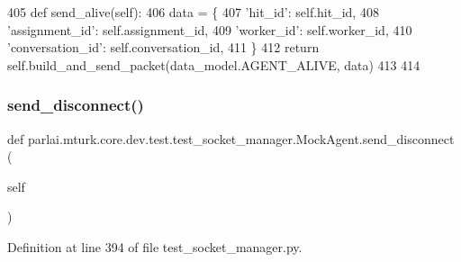 \begin{DoxyCode}
405     \textcolor{keyword}{def }send\_alive(self):
406         data = \{
407             \textcolor{stringliteral}{'hit\_id'}: self.hit\_id,
408             \textcolor{stringliteral}{'assignment\_id'}: self.assignment\_id,
409             \textcolor{stringliteral}{'worker\_id'}: self.worker\_id,
410             \textcolor{stringliteral}{'conversation\_id'}: self.conversation\_id,
411         \}
412         \textcolor{keywordflow}{return} self.build\_and\_send\_packet(data\_model.AGENT\_ALIVE, data)
413 
414 
\end{DoxyCode}
\mbox{\label{classparlai_1_1mturk_1_1core_1_1dev_1_1test_1_1test__socket__manager_1_1MockAgent_ac4626723af7b420e59f2624b45684411}} 
\subsubsection{\texorpdfstring{send\+\_\+disconnect()}{send\_disconnect()}}
{\footnotesize\ttfamily def parlai.\+mturk.\+core.\+dev.\+test.\+test\+\_\+socket\+\_\+manager.\+Mock\+Agent.\+send\+\_\+disconnect (\begin{DoxyParamCaption}\item[{}]{self }\end{DoxyParamCaption})}



Definition at line 394 of file test\+\_\+socket\+\_\+manager.\+py.


